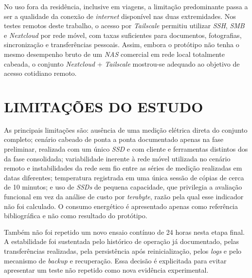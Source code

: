 No uso fora da residência, inclusive em viagens, a limitação predominante passa a ser a qualidade da conexão de \textit{internet} disponível nas duas extremidades. Nos testes remotos deste trabalho, o acesso por \textit{Tailscale} permitiu utilizar \textit{SSH}, \textit{SMB} e \textit{Nextcloud} por rede móvel, com taxas suficientes para documentos, fotografias, sincronização e transferências pessoais. Assim, embora o protótipo não tenha o mesmo desempenho bruto de um \textit{NAS} comercial em rede local totalmente cabeada, o conjunto \textit{Nextcloud} + \textit{Tailscale} mostrou-se adequado ao objetivo de acesso cotidiano remoto.

\section{LIMITAÇÕES DO ESTUDO}
\label{sec:limitacoes}

As principais limitações são: ausência de uma medição elétrica direta do conjunto completo; cenário cabeado de ponta a ponta documentado apenas na fase preliminar, realizada com um único \textit{SSD} e com cliente e ferramentas distintos dos da fase consolidada; variabilidade inerente à rede móvel utilizada no cenário remoto e instabilidades da rede sem fio entre as séries de medição realizadas em datas diferentes; temperatura registrada em uma única sessão de cópias de cerca de 10 minutos; e uso de \textit{SSDs} de pequena capacidade, que privilegia a avaliação funcional em vez da análise de custo por \textit{terabyte}, razão pela qual esse indicador não foi calculado. O consumo energético é apresentado apenas como referência bibliográfica e não como resultado do protótipo.

Também não foi repetido um novo ensaio contínuo de 24 horas nesta etapa final. A estabilidade foi sustentada pelo histórico de operação já documentado, pelas transferências realizadas, pela persistência após reinicialização, pelos \textit{logs} e pelo mecanismo de \textit{backup} e recuperação. Essa decisão é explicitada para evitar apresentar um teste não repetido como nova evidência experimental.
